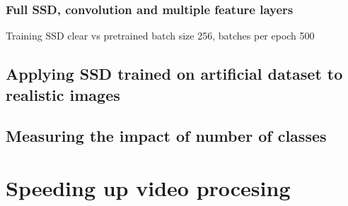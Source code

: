 \subsubsection{Full SSD, convolution and multiple feature layers}
Training SSD clear vs pretrained
batch size 256, batches per epoch 500



\subsection{Applying SSD trained on artificial dataset to realistic images}

\subsection{Measuring the impact of number of classes}

\section{Speeding up video procesing}